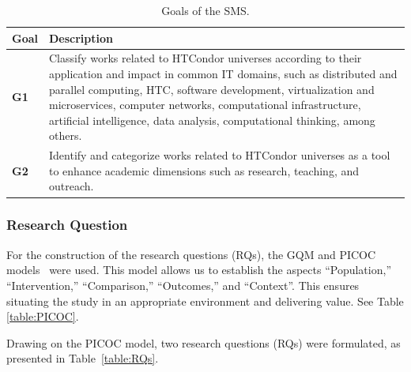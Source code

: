 \begin{table}[htbp]
	\centering
	\caption{Goals of the SMS.}
	\label{table:Goals}
	\renewcommand{\arraystretch}{1}  %
	\begin{tabular}{p{1cm}p{6.8cm}}
		\toprule
		\textbf{Goal} & \textbf{Description}                                                                                                                                                                                                                                                                                                                                         \\
		\midrule
		\textbf{G1}       & Classify works related to HTCondor universes according to their application and impact in common IT domains, such as distributed and parallel computing, HTC, software development, virtualization and microservices, computer networks, computational infrastructure, artificial intelligence, data analysis, computational thinking, among others. \\
		\addlinespace[0.8em]
		\textbf{G2}       & Identify and categorize works related to HTCondor universes as a tool to enhance academic dimensions such as research, teaching, and outreach.     \\
		\bottomrule
	\end{tabular}
\end{table}


\subsubsection{Research Question}
For the construction of the research questions (RQs), the GQM and PICOC models~\cite{Needleman20026, Petticrew2008systematic} were used. This model allows us to establish the aspects ``Population,'' ``Intervention,'' ``Comparison,'' ``Outcomes,'' and ``Context''. This ensures situating the study in an appropriate environment and delivering value. See Table \ref{table:PICOC}.

Drawing on the PICOC model, two research questions (RQs) were formulated, as presented in Table~\ref{table:RQs}.

